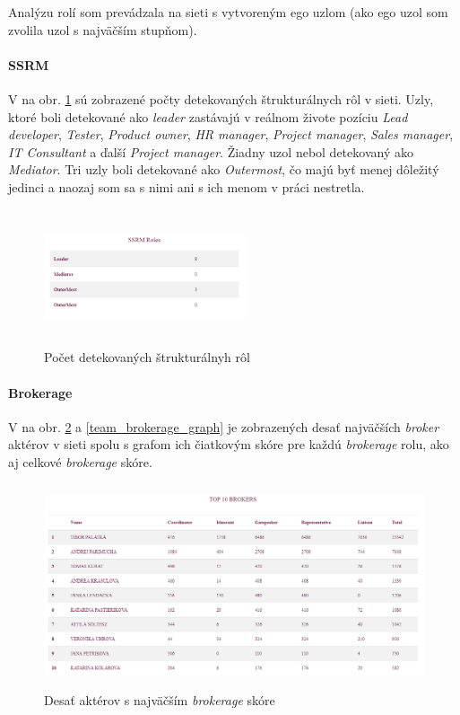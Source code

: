 \documentclass[slovak,master,public,dept460,male,cpdeclaration,oneside]{diploma}
\begin{document}
Analýzu rolí som prevádzala na sieti s vytvoreným ego uzlom (ako ego uzol som zvolila uzol s najväčším stupňom). 

\paragraph{SSRM}
\hfill \break
V na obr. \ref{team_ssrm} sú zobrazené počty detekovaných štrukturálnych rôl v sieti. Uzly, ktoré boli detekované ako \textit{leader} zastávajú v reálnom živote pozíciu \textit{Lead developer}, \textit{Tester}, \textit{Product owner}, \textit{HR manager}, \textit{Project manager}, \textit{Sales manager}, \textit{IT Consultant} a ďalší \textit{Project manager}. Žiadny uzol nebol detekovaný ako \textit{Mediator}. Tri uzly boli detekované ako \textit{Outermost}, čo majú byť menej dôležitý jedinci a naozaj som sa s nimi ani s ich menom v práci nestretla.

\begin{figure}[H]
\centering
\includegraphics[width=6cm, height=4cm]{figures/team_ssrm}
\caption{Počet detekovaných štrukturálnyh rôl}
\label{team_ssrm}
\end{figure}


\paragraph{Brokerage}
\hfill \break
V na obr. \ref{team_brokerage_tab} a \ref{team_brokerage_graph} je zobrazených desať najväčších \textit{broker} aktérov v sieti spolu s grafom ich čiatkovým skóre pre každú \textit{brokerage} rolu, ako aj celkové \textit{brokerage} skóre.


\begin{figure}[H]
\centering
\includegraphics[width=15cm, height=6cm]{figures/team_brokerage_tab}
\caption{Desať aktérov s najväčším \textit{brokerage} skóre}
\label{team_brokerage_tab}
\end{figure}
\end{document}
